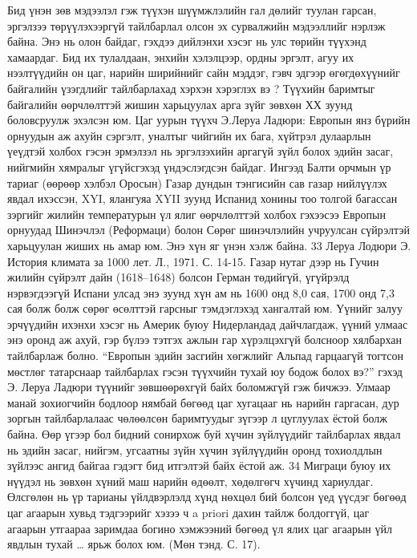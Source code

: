 Бид үнэн зөв мэдээлэл гэж түүхэн шүүмжлэлийн гал дөлийг туулан гарсан, эргэлзээ төрүүлэхээргүй тайлбарлал олсон эх сурвалжийн мэдээллийг нэрлэж байна. Энэ нь олон байдаг, гэхдээ дийлэнхи хэсэг нь улс төрийн түүхэнд хамаардаг. Бид их тулалдаан, энхийн хэлэлцээр, ордны эргэлт, агуу их нээлтүүдийн он цаг, нарийн ширийнийг сайн мэддэг, гэвч эдгээр өгөгдөхүүнийг байгалийн үзэгдлийг тайлбарлахад хэрхэн хэрэглэх вэ ? Түүхийн баримтыг байгалийн өөрчлөлттэй жишин харьцуулах арга зүйг зөвхөн ХХ зуунд боловсруулж эхэлсэн юм.
Цаг уурын түүхч Э.Леруа Ладюри: Европын янз бүрийн орнуудын аж ахуйн сэргэлт, уналтыг чийгийн их бага, хүйтрэл дулаарлын үеүдтэй холбох гэсэн эрмэлзэл нь эргэлзэхийн аргагүй зүйл болох эдийн засаг, нийгмийн хямралыг үгүйсгэхэд үндэслэгдсэн байдаг. Ингээд Балти орчмын үр тариаг (өөрөөр хэлбэл Оросын) Газар дундын тэнгисийн сав газар нийлүүлэх явдал ихэссэн, XYI, ялангуяа XYII зуунд Испанид хонины тоо толгой багассан зэргийг жилийн температурын үл ялиг өөрчлөлттэй холбох гэхээсээ Европын орнуудад Шинэчлэл (Реформаци) болон Сөрөг шинэчлэлийн учруулсан сүйрэлтэй харьцуулан жиших нь амар юм. Энэ хүн яг үнэн хэлж байна.
33 Леруа Лодюри Э. История климата за 1000 лет. Л., 1971. С. 14-15.
Газар нутаг дээр нь Гучин жилийн сүйрэлт дайн (1618–1648) болсон Герман төдийгүй, үгүйрэлд нэрвэгдээгүй Испани улсад энэ зуунд хүн ам нь 1600 онд 8,0 сая, 1700 онд 7,3 сая болж болж сөрөг өсөлттэй гарсныг тэмдэглэхэд хангалтай юм. Үүнийг залуу эрчүүдийн ихэнхи хэсэг нь Америк буюу Нидерландад дайчлагдаж, үүний улмаас энэ оронд аж ахуй, гэр бүлээ тэтгэх ажлын гар хүрэлцэхгүй болсноор хялбархан тайлбарлаж болно.
“Европын эдийн засгийн хөгжлийг Альпад гарцаагүй тогтсон мөстлөг татарснаар тайлбарлах гэсэн түүхчийн тухай юу бодож болох вэ?” гэхэд Э. Леруа Ладюри түүнийг зөвшөөрөхгүй байх боломжгүй гэж бичжээ.
Улмаар манай зохиогчийн бодлоор нямбай бөгөөд цаг хугацааг нь нарийн гаргасан, дур зоргын тайлбарлалаас чөлөөлсөн баримтуудыг зүгээр л цуглуулах ёстой болж байна. Өөр үгээр бол бидний сонирхож буй хүчин зүйлүүдийг тайлбарлах явдал нь эдийн засаг, нийгэм, угсаатны зүйн хүчин зүйлүүдийн оронд тохиолдлын зүйлээс ангид байгаа гэдэгт бид итгэлтэй байх ёстой аж.
34 Миграци буюу их нүүдэл нь зөвхөн хүний маш нарийн өдөөлт, хөдөлгөгч хүчинд хариулдаг. Өлсгөлөн нь үр тарианы үйлдвэрлэлд хүнд нөхцөл бий болсон үед үүсдэг бөгөөд цаг агаарын хувьд тэдгээрийг хэзээ ч a priori дахин тайлж болдоггүй, цаг агаарын утгаараа заримдаа богино хэмжээний бөгөөд үл ялих цаг агаарын үйл явдлын тухай … ярьж болох юм. (Мөн тэнд. С. 17).
